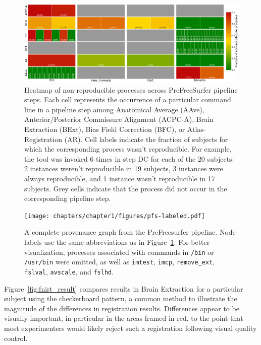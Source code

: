 \begin{figure}
\centering
  \includegraphics[width=\textwidth]{chapters/chapter1/figures/heatmap.pdf}
  \caption{Heatmap of non-reproducible processes across PreFreeSurfer pipeline steps.
  Each cell represents the occurrence of a particular command line in a
  pipeline step among Anatomical Average (AAve), Anterior/Posterior
  Commissure Alignment (ACPC-A), Brain Extraction (BExt), Bias Field
  Correction (BFC), or Atlas-Registration (AR). Cell labels indicate the
  fraction of subjects for which the corresponding process wasn't reproducible. For example,
  the \flirt tool was invoked 6 times in step DC for each of the 20
  subjects: 2 instances weren't reproducible in 19 subjects, 3
  instances were always reproducible, and 1 instance wasn't reproducible in
  17 subjects.
  Grey cells indicate that the process did not occur in the corresponding pipeline step.}
  \label{fig:pfs_heatmap}
\end{figure}

\begin{figure}
   \centering
    \texttt{[image: chapters/chapter1/figures/pfs-labeled.pdf]}
    \caption{A complete provenance graph from the PreFreesurfer pipeline.
    Node labels use the same abbreviations as in Figure~\ref{fig:pfs_heatmap}.
    For better visualization, processes associated with commands
    in \texttt{/bin} or \texttt{/usr/bin} were omitted, as well as
  \texttt{imtest}, \texttt{imcp}, \texttt{remove\_ext}, \texttt{fslval}, \texttt{avscale}, and \texttt{fslhd}.}
    \label{fig:complete_pfs}
\end{figure}

Figure~\ref{fig:fnirt_result} compares \fnirt results in Brain Extraction
for a particular subject using the checkerboard pattern,
a common method to illustrate the magnitude of the differences in registration results.
Differences appear to be visually important, in particular in the areas framed in red, 
to the point that most experimenters would likely reject such a registration following visual quality control.

